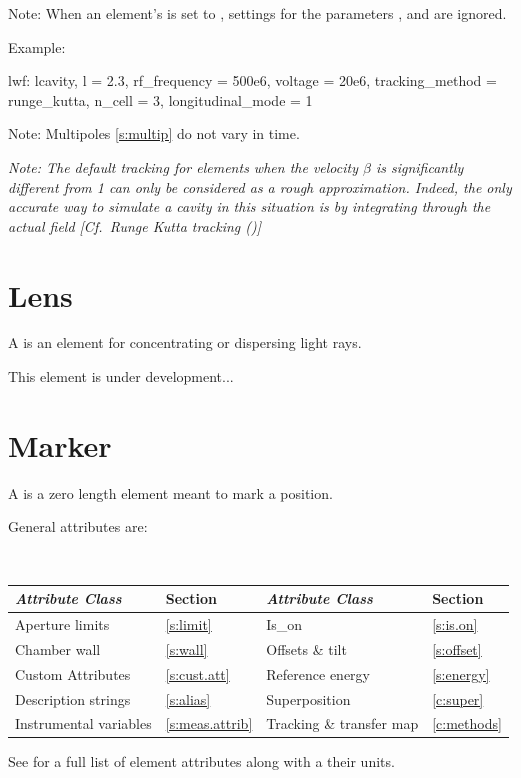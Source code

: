 {Note: When an element's  is set to , settings for the
parameters , and  are ignored.

Example:
\begin{example}
  lwf: lcavity, l = 2.3, rf_frequency = 500e6, voltage = 20e6,
         tracking_method = runge_kutta, n_cell = 3, longitudinal_mode = 1
\end{example}

Note: Multipoles \ref{s:multip} do not vary in time.

{\em Note: The default  tracking for  elements when the velocity
$\beta$ is significantly different from 1 can only be considered as a rough approximation. Indeed,
the only accurate way to simulate a cavity in this situation is by integrating through the actual
field [Cf.~Runge Kutta tracking ()]}

\newpage

\section{Lens}
\label{s:lens}

A  is an element for concentrating or dispersing light rays.

This element is under development...

\newpage

\section{Marker}
\label{s:mark}

A  is a zero length element meant to mark a position. 

General  attributes are:
\begin{center} 
\tt
\begin{tabular}{llll} \toprule
  {\sl Attribute Class}      & Section             & {\sl Attribute Class}        & Section         \\ \midrule
  Aperture limits            & \ref{s:limit}       & Is_on                        & \ref{s:is.on}   \\ 
  Chamber wall               & \ref{s:wall}        & Offsets \& tilt              & \ref{s:offset}  \\
  Custom Attributes          & \ref{s:cust.att}    & Reference energy             & \ref{s:energy}  \\
  Description strings        & \ref{s:alias}       & Superposition                & \ref{c:super}   \\
  Instrumental variables     & \ref{s:meas.attrib} & Tracking \& transfer map     & \ref{c:methods} \\ 
  \bottomrule
\end{tabular}
\end{center}
\toffset
See  for a full list of element attributes along with a their units.

}
